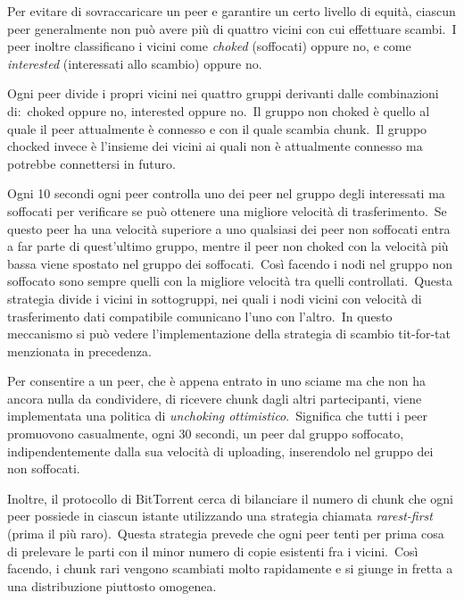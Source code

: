 Per evitare di sovraccaricare un peer e garantire un certo livello di equità, ciascun peer generalmente non può avere più di quattro vicini con cui effettuare scambi.\
I peer inoltre classificano i vicini come \emph{choked} (soffocati) oppure no, e come \emph{interested} (interessati allo scambio) oppure no.

Ogni peer divide i propri vicini nei quattro gruppi derivanti dalle combinazioni di:\ choked oppure no, interested oppure no.\
Il gruppo non choked è quello al quale il peer attualmente è connesso e con il quale scambia chunk.\
Il gruppo chocked invece è l'insieme dei vicini ai quali non è attualmente connesso ma potrebbe connettersi in futuro.

Ogni 10 secondi ogni peer controlla uno dei peer nel gruppo degli interessati ma soffocati per verificare se può ottenere una migliore velocità di trasferimento.\
Se questo peer ha una velocità superiore a uno qualsiasi dei peer non soffocati entra a far parte di quest'ultimo gruppo, mentre il peer non choked con la velocità più bassa viene spostato nel gruppo dei soffocati.\
Così facendo i nodi nel gruppo non soffocato sono sempre quelli con la migliore velocità tra quelli controllati.\
Questa strategia divide i vicini in sottogruppi, nei quali i nodi vicini con velocità di trasferimento dati compatibile comunicano l'uno con l'altro.\
In questo meccanismo si può vedere l'implementazione della strategia di scambio tit-for-tat menzionata in precedenza.

Per consentire a un peer, che è appena entrato in uno sciame ma che non ha ancora nulla da condividere, di ricevere chunk dagli altri partecipanti, viene implementata una politica di \emph{unchoking ottimistico}.\
Significa che tutti i peer promuovono casualmente, ogni 30 secondi, un peer dal gruppo soffocato, indipendentemente dalla sua velocità di uploading, inserendolo nel gruppo dei non soffocati.

Inoltre, il protocollo di BitTorrent cerca di bilanciare il numero di chunk che ogni peer possiede in ciascun istante utilizzando una strategia chiamata \emph{rarest-first} (prima il più raro).\
Questa strategia prevede che ogni peer tenti per prima cosa di prelevare le parti con il minor numero di copie esistenti fra i vicini.\
Così facendo, i chunk rari vengono scambiati molto rapidamente e si giunge in fretta a una distribuzione piuttosto omogenea.
